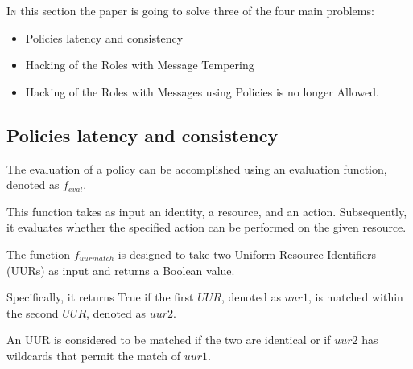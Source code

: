\lettrine{I}{n} this section the paper is going to solve three of the four main problems:

\begin{itemize}
    \item Policies latency and consistency
    \item Hacking of the Roles with Message Tempering
    \item Hacking of the Roles with Messages using Policies is no longer Allowed.
\end{itemize}

\subsection{Policies latency and consistency}
\label{sec:policies-latency-consistency}

The evaluation of a policy can be accomplished using an evaluation function, denoted as $f_{eval}$.

This function takes as input an identity, a resource, and an action. 
Subsequently, it evaluates whether the specified action can be performed on the given resource.

\begin{boxF}
    \begin{definition}
        The function $f_{uurmatch}$ is designed to take two Uniform Resource Identifiers (UURs) as input and returns a Boolean value.
        
        Specifically, it returns True if the first $UUR$, denoted as $uur1$, is matched within the second $UUR$, denoted as $uur2$. 
        
        An UUR is considered to be matched if the two are identical or if $uur2$ has wildcards that permit the match of $uur1$.
    \end{definition}
\end{boxF}

